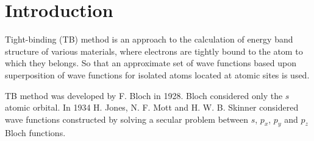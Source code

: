 \chapter{Introduction}
\label{ch:introduction}
Tight-binding (TB) method is an approach to the calculation of energy band structure of various materials, where electrons are tightly bound to the atom to which they belongs. So that an approximate set of wave functions based upon superposition of wave functions for isolated atoms located at atomic sites is used.

TB method was developed by F. Bloch \cite{bloch} in 1928.  Bloch considered only the $s$ atomic orbital. In 1934 H. Jones, N. F. Mott and H. W. B. Skinner \cite{mott} considered wave functions constructed by solving a secular problem between $s$, $p_x$, $p_y$ and $p_z$ Bloch functions.